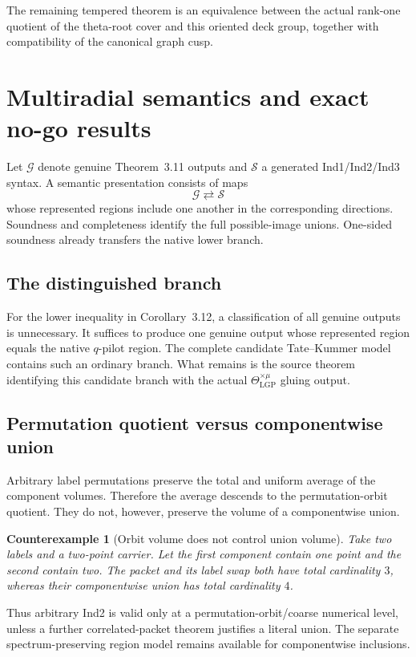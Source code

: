 \documentclass[11pt]{article}
\newtheorem{counterexample}[theorem]{Counterexample}
\begin{document}
The remaining tempered theorem is an equivalence between the actual
rank-one quotient of the theta-root cover and this oriented deck group,
together with compatibility of the canonical graph cusp.

\section{Multiradial semantics and exact no-go results}

Let $\mathcal G$ denote genuine Theorem~3.11 outputs and $\mathcal S$ a
generated Ind1/Ind2/Ind3 syntax.  A semantic presentation consists of maps
\[
 \mathcal G\rightleftarrows\mathcal S
\]
whose represented regions include one another in the corresponding
directions.  Soundness and completeness identify the full possible-image
unions.  One-sided soundness already transfers the native lower branch.

\subsection{The distinguished branch}
For the lower inequality in Corollary~3.12, a classification of all genuine
outputs is unnecessary.  It suffices to produce one genuine output whose
represented region equals the native $q$-pilot region.  The complete candidate
Tate--Kummer model contains such an ordinary branch.  What remains is the
source theorem identifying this candidate branch with the actual
$\Theta^{\times\mu}_{\mathrm{LGP}}$ gluing output.

\subsection{Permutation quotient versus componentwise union}
Arbitrary label permutations preserve the total and uniform average of the
component volumes.  Therefore the average descends to the permutation-orbit
quotient.  They do not, however, preserve the volume of a componentwise union.

\begin{counterexample}[Orbit volume does not control union volume]
Take two labels and a two-point carrier.  Let the first component contain one
point and the second contain two.  The packet and its label swap both have
total cardinality $3$, whereas their componentwise union has total cardinality
$4$.
\end{counterexample}

Thus arbitrary Ind2 is valid only at a permutation-orbit/coarse numerical
level, unless a further correlated-packet theorem justifies a literal union.
The separate spectrum-preserving region model remains available for
componentwise inclusions.
\end{document}
